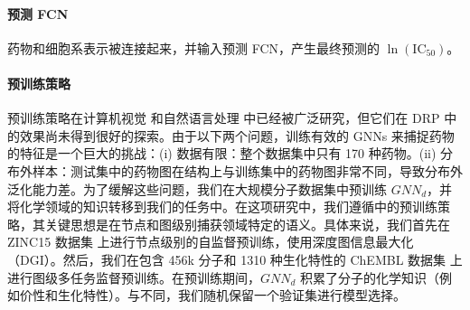 \paragraph{预测 FCN}
药物和细胞系表示被连接起来，并输入预测 FCN，产生最终预测的 $\ln(\text{IC}_{50})$。

\paragraph{预训练策略}
预训练策略在计算机视觉\cite{He2019} 和自然语言处理\cite{Kenton2019} 中已经被广泛研究，但它们在 DRP 中的效果尚未得到很好的探索。由于以下两个问题，训练有效的 GNNs 来捕捉药物的特征是一个巨大的挑战：(i) 数据有限：整个数据集中只有 170 种药物。(ii) 分布外样本：测试集中的药物图在结构上与训练集中的药物图非常不同，导致分布外泛化能力差。为了缓解这些问题，我们在大规模分子数据集中预训练 $GNN_d$，并将化学领域的知识转移到我们的任务中。在这项研究中，我们遵循中的预训练策略，其关键思想是在节点和图级别捕获领域特定的语义。具体来说，我们首先在 ZINC15 数据集\cite{Sterling2015} 上进行节点级别的自监督预训练，使用深度图信息最大化（DGI）\cite{Velickovic2019}。然后，我们在包含 456k 分子和 1310 种生化特性的 ChEMBL 数据集\cite{Gaulton2012} 上进行图级多任务监督预训练。在预训练期间，$GNN_d$ 积累了分子的化学知识（例如价性和生化特性）。与不同，我们随机保留一个验证集进行模型选择。

